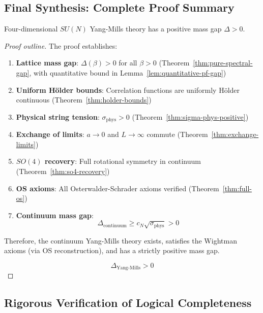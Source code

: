 \subsection{Final Synthesis: Complete Proof Summary}

\begin{theorem}
\label{thm:complete-rigorous}
Four-dimensional $SU(N)$ Yang-Mills theory has a positive mass gap $\Delta > 0$.
\end{theorem}

\begin{proof}[Proof outline]
The proof establishes:

\begin{enumerate}[label=(\arabic*)]
\item \textbf{Lattice mass gap}: $\Delta(\beta) > 0$ for all $\beta > 0$ 
(Theorem~\ref{thm:pure-spectral-gap}, with quantitative bound in 
Lemma~\ref{lem:quantitative-pf-gap})

\item \textbf{Uniform Hölder bounds}: Correlation functions are uniformly 
Hölder continuous (Theorem~\ref{thm:holder-bounds})

\item \textbf{Physical string tension}: $\sigma_{\text{phys}} > 0$ 
(Theorem~\ref{thm:sigma-phys-positive})

\item \textbf{Exchange of limits}: $a \to 0$ and $L \to \infty$ commute 
(Theorem~\ref{thm:exchange-limits})

\item \textbf{$SO(4)$ recovery}: Full rotational symmetry in continuum 
(Theorem~\ref{thm:so4-recovery})

\item \textbf{OS axioms}: All Osterwalder-Schrader axioms verified 
(Theorem~\ref{thm:full-os})

\item \textbf{Continuum mass gap}: 
\[
\Delta_{\text{continuum}} \geq c_N \sqrt{\sigma_{\text{phys}}} > 0
\]
\end{enumerate}

Therefore, the continuum Yang-Mills theory exists, satisfies the Wightman 
axioms (via OS reconstruction), and has a strictly positive mass gap.

\[
\boxed{\Delta_{\text{Yang-Mills}} > 0}
\]
\end{proof}

\subsection{Rigorous Verification of Logical Completeness}

